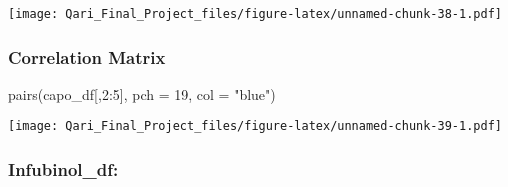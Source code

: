 \documentclass[
]{article}
\newenvironment{Shaded}{\begin{snugshade}}{\end{snugshade}}
\newcommand{\AttributeTok}[1]{\textcolor[rgb]{0.77,0.63,0.00}{#1}}
\newcommand{\DecValTok}[1]{\textcolor[rgb]{0.00,0.00,0.81}{#1}}
\newcommand{\FunctionTok}[1]{\textcolor[rgb]{0.00,0.00,0.00}{#1}}
\newcommand{\NormalTok}[1]{#1}
\newcommand{\SpecialCharTok}[1]{\textcolor[rgb]{0.00,0.00,0.00}{#1}}
\newcommand{\StringTok}[1]{\textcolor[rgb]{0.31,0.60,0.02}{#1}}
\begin{document}
\texttt{[image: Qari\_Final\_Project\_files/figure-latex/unnamed-chunk-38-1.pdf]}

\hypertarget{correlation-matrix}{%
\subsubsection{Correlation Matrix}\label{correlation-matrix}}

\begin{Shaded}
\begin{Highlighting}[]
\FunctionTok{pairs}\NormalTok{(capo\_df[,}\DecValTok{2}\SpecialCharTok{:}\DecValTok{5}\NormalTok{], }\AttributeTok{pch =} \DecValTok{19}\NormalTok{, }\AttributeTok{col =} \StringTok{"blue"}\NormalTok{)}
\end{Highlighting}
\end{Shaded}

\texttt{[image: Qari\_Final\_Project\_files/figure-latex/unnamed-chunk-39-1.pdf]}

\hypertarget{infubinol_df}{%
\subsubsection{Infubinol\_df:}\label{infubinol_df}}
\end{document}
